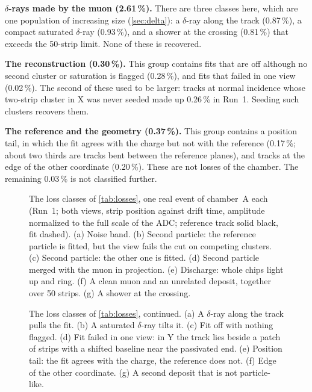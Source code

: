 \textbf{$\delta$-rays made by the muon (2.61\,\%).} There are three classes here, which are one population of
increasing size (\cref{sec:delta}): a $\delta$-ray along the track (0.87\,\%), a compact saturated $\delta$-ray
(0.93\,\%), and a shower at the crossing (0.81\,\%) that exceeds the 50-strip limit. None of these is recovered.

\textbf{The reconstruction (0.30\,\%).} This group contains fits that are off although no second cluster or
saturation is flagged (0.28\,\%), and fits that failed in one view (0.02\,\%). The second of these used to be larger:
tracks at normal incidence whose two-strip cluster in X was never seeded made up 0.26\,\% in Run~1. Seeding such
clusters recovers them.

\textbf{The reference and the geometry (0.37\,\%).} This group contains a position tail, in which the fit agrees with
the charge but not with the reference (0.17\,\%; about two thirds are tracks bent between the reference planes), and
tracks at the edge of the other coordinate (0.20\,\%). These are not losses of the chamber. The remaining 0.03\,\% is
not classified further.

\begin{figure}[p]
  \centering
  \caption{The loss classes of \cref{tab:losses}, one real event of chamber~A each (Run~1; both views, strip position
  against drift time, amplitude normalized to the full scale of the ADC; reference track solid black, fit dashed).
  (a) Noise band. (b) Second particle: the reference particle is fitted, but the view fails the cut on competing
  clusters. (c) Second particle: the other one is fitted. (d) Second particle merged with the muon in projection. (e)
  Discharge: whole chips light up and ring. (f) A clean muon and an unrelated deposit, together over 50 strips. (g) A
  shower at the crossing.}
  \label{fig:gallery1}
\end{figure}
\begin{figure}[p]
  \centering
  \caption{The loss classes of \cref{tab:losses}, continued. (a) A $\delta$-ray along the track pulls the fit. (b) A
  saturated $\delta$-ray tilts it. (c) Fit off with nothing flagged. (d) Fit failed in one view: in Y the track lies
  beside a patch of strips with a shifted baseline near the passivated end. (e) Position tail: the fit agrees with the
  charge, the reference does not. (f) Edge of the other coordinate. (g) A second deposit that is not particle-like.}
  \label{fig:gallery2}
\end{figure}
